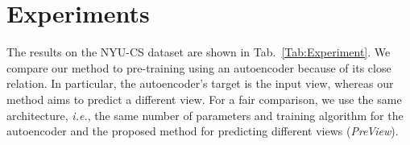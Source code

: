\documentclass[10pt,twocolumn,letterpaper]{article}
\begin{document}
\section{Experiments}
The results on the NYU-CS dataset are shown in Tab.~\ref{Tab:Experiment}.
We compare our method to pre-training using an autoencoder
because of its close relation. In particular, the autoencoder’s
target is the input view, whereas our method aims
to predict a different view. For a fair comparison, we use
the same architecture, \emph{i.e.}, the same number of parameters
and training algorithm for the autoencoder and the proposed
method for predicting different views (\emph{PreView}).

{\small


}
\end{document}
